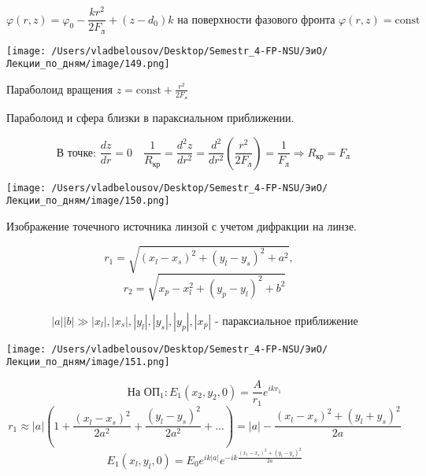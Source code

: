 \documentclass[12pt, a4paper]{report}
\begin{document}
\[ \varphi (r, z ) = \varphi_0 - \frac{k r ^2 }{2 F_{\text{л} } } + (z - d_0 ) k \text{ на поверхности фазового фронта } \varphi (r, z ) = \mathrm{ const}    \] 

\begin{center}
    \texttt{[image: /Users/vladbelousov/Desktop/Semestr\_4-FP-NSU/ЭиО/Лекции\_по\_дням/image/149.png]}
\end{center}
Параболоид вращения \( z = \mathrm{const }  + \displaystyle  \frac{ r ^2 }{2 F_{\text{л} } }   \) 

Параболоид и сфера близки в параксиальном приближении. 

\[ \text{В точке: }  \frac{d z }{d r } = 0 \quad  \frac{1}{R_{\text{кр} } } = \frac{ d ^2  z }{ d r ^2  } = \frac{d ^2 }{dr ^2 }   \left( \frac{ r ^2 }{2 F_{\text{л} } }  \right)   = \frac{1}{F_{\text{л} } }  \Rightarrow R_{\text{кр} } = F _{\text{л }  }  \] 

\begin{center}
    \texttt{[image: /Users/vladbelousov/Desktop/Semestr\_4-FP-NSU/ЭиО/Лекции\_по\_дням/image/150.png]}
\end{center}

Изображение  точечного источника линзой с учетом дифракции на линзе. 

\[ r_1 = \sqrt{(x_l - x_s ) ^2 + (y_l - y _s ) ^2 + a ^2 } , \quad \] 
\[ r_2 = \sqrt{x_p - x_l  ^2 + (y_p - y_l ) ^2 + b ^2  } \] 

\[ \left\lvert a  \right\rvert \left\lvert b  \right\rvert \gg \left\lvert x_l     \right\rvert, \left\lvert x_s  \right\rvert , \left\lvert y_l  \right\rvert , \left\lvert y_s  \right\rvert, \left\lvert y_p  \right\rvert, \left\lvert x_p \right\rvert   \text{ - параксиальное приближение}  \] 

\begin{center}
    \texttt{[image: /Users/vladbelousov/Desktop/Semestr\_4-FP-NSU/ЭиО/Лекции\_по\_дням/image/151.png]}
\end{center}

\[ \text{На ОП}_1 : E_1 (x_2,y_2, 0) = \frac{A}{r_1 } e^{i k r_1 }    \] 
\[ r_1 \approx \left\lvert a  \right\rvert \left(  1 + \frac{ (x_l - x_s) ^2 }{2 a^2} + \frac{(y_l - y_s ) ^2 }{2 a ^2 } +...    \right) = \left\lvert a  \right\rvert - \frac{(x_l - x_s ) ^2  + (y_l + y_s) ^2 }{2a }  \] 
\[ E_1(x_l, y_l , 0 ) = E_0 e^{ i k \left\lvert a  \right\rvert} e^{ - i k \frac{ (x_l - x_s ) ^2 + (y_l - y_s) ^2   }{2a } }    \] 
\end{document}
